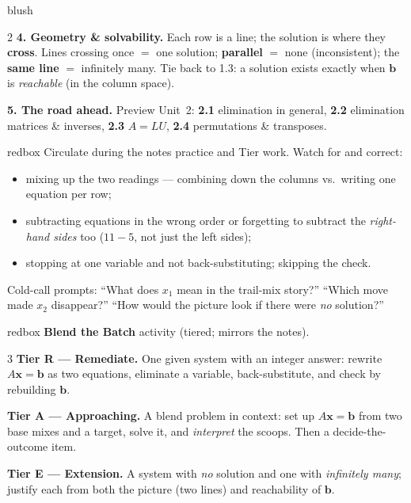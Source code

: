 \documentclass[10pt]{article}
\newcommand{\xx}{\mathbf{x}}
\newcommand{\bb}{\mathbf{b}}
\begin{document}
\begin{skillbox}[Lesson]{blush}
\begin{multicols}{2}
\textbf{4. Geometry \& solvability.} Each row is a line; the solution is where they
\textbf{cross}. Lines crossing once $=$ one solution; \textbf{parallel} $=$ none (inconsistent);
the \textbf{same line} $=$ infinitely many. Tie back to 1.3: a solution exists exactly when
$\bb$ is \emph{reachable} (in the column space).

\textbf{5. The road ahead.} Preview Unit~2: \textbf{2.1} elimination in general, \textbf{2.2}
elimination matrices \& inverses, \textbf{2.3} $A=LU$, \textbf{2.4} permutations \& transposes.
\end{multicols}
\end{skillbox}

\begin{skillbox}{redbox}
Circulate during the notes practice and Tier work. Watch for and correct:
\begin{itemize}[leftmargin=1.2em, nosep]
  \item mixing up the two readings --- combining down the columns vs.\ writing one equation per row;
  \item subtracting equations in the wrong order or forgetting to subtract the \emph{right-hand
        sides} too ($11-5$, not just the left sides);
  \item stopping at one variable and not back-substituting; skipping the check.
\end{itemize}
Cold-call prompts: ``What does $x_1$ mean in the trail-mix story?'' ``Which move made $x_2$
disappear?'' ``How would the picture look if there were \emph{no} solution?''
\end{skillbox}

\begin{skillbox}{redbox}
\textbf{Blend the Batch} activity (tiered; mirrors the notes).
\begin{multicols}{3}
\textbf{Tier R --- Remediate.} One given system with an integer answer: rewrite $A\xx=\bb$ as
two equations, eliminate a variable, back-substitute, and check by rebuilding $\bb$.

\columnbreak
\textbf{Tier A --- Approaching.} A blend problem in context: set up $A\xx=\bb$ from two base
mixes and a target, solve it, and \emph{interpret} the scoops. Then a decide-the-outcome item.

\columnbreak
\textbf{Tier E --- Extension.} A system with \emph{no} solution and one with \emph{infinitely
many}; justify each from both the picture (two lines) and reachability of $\bb$.
\end{multicols}
\end{skillbox}
\end{document}

